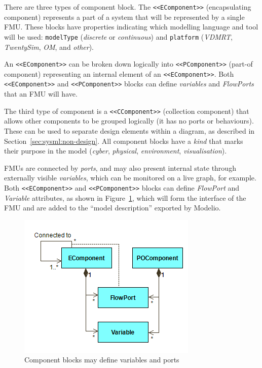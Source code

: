 There are three types of component block. The \texttt{<<EComponent>>} (encapsulating component) represents a part of a system that will be represented by a single FMU. These blocks have properties indicating which modelling language and tool will be used: \texttt{modelType} (\emph{discrete} or \emph{continuous}) and \texttt{platform} (\emph{VDMRT}, \emph{TwentySim}, \emph{OM}, and \emph{other}).

An \texttt{<<EComponent>>} can be broken down logically into \texttt{<<PComponent>>} (part-of component) representing an internal element of an \texttt{<<EComponent>>}. Both \texttt{<<EComponent>>} and \texttt{<<PComponent>>} blocks can define \emph{variables} and \emph{FlowPorts} that an FMU will have.

The third type of component is a \texttt{<<CComponent>>} (collection component) that allows other components to be grouped logically (it has no ports or behaviours). These can be used to separate design elements within a diagram, as described in Section~\ref{sec:sysml:non-design}. All component blocks have a \emph{kind} that marks their purpose in the model (\emph{cyber}, \emph{physical}, \emph{environment}, \emph{visualisation}).

FMUs are connected by \emph{ports}, and may also present internal state through externally visible \emph{variables}, which can be monitored on a live graph, for example. Both \texttt{<<EComponent>>} and \texttt{<<PComponent>>} blocks can define \emph{FlowPort} and \emph{Variable} attributes, as shown in Figure~\ref{fig:sysml:sysml:intocps:asi}, which will form the interface of the FMU and are added to the ``model description'' exported by Modelio.

\begin{figure}[h!]
\centering
\includegraphics[scale=0.6]{figures/Architecting/ArchitecturalStructureInterfaces}
\caption{Component blocks may define variables and ports}
\label{fig:sysml:sysml:intocps:asi}
\end{figure}

